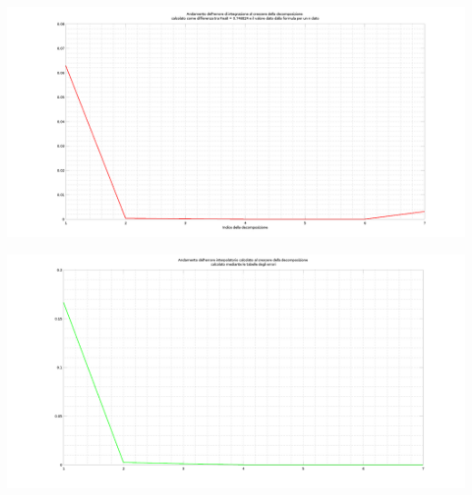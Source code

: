 \documentclass{article}
\begin{document}
\centerline{\includegraphics[scale=0.5]{ex72a.png}}
\centerline{\includegraphics[scale=0.5]{ex72b.png}}

\newpage
\end{document}
